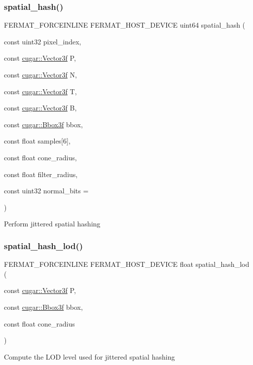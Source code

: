 \subsubsection{\texorpdfstring{spatial\+\_\+hash()}{spatial\_hash()}\hspace{0.1cm}{\footnotesize\ttfamily [2/2]}}
{\footnotesize\ttfamily F\+E\+R\+M\+A\+T\+\_\+\+F\+O\+R\+C\+E\+I\+N\+L\+I\+NE F\+E\+R\+M\+A\+T\+\_\+\+H\+O\+S\+T\+\_\+\+D\+E\+V\+I\+CE uint64 spatial\+\_\+hash (\begin{DoxyParamCaption}\item[{const uint32}]{pixel\+\_\+index,  }\item[{const \hyperlink{structcugar_1_1_vector}{cugar\+::\+Vector3f}}]{P,  }\item[{const \hyperlink{structcugar_1_1_vector}{cugar\+::\+Vector3f}}]{N,  }\item[{const \hyperlink{structcugar_1_1_vector}{cugar\+::\+Vector3f}}]{T,  }\item[{const \hyperlink{structcugar_1_1_vector}{cugar\+::\+Vector3f}}]{B,  }\item[{const \hyperlink{structcugar_1_1_bbox}{cugar\+::\+Bbox3f}}]{bbox,  }\item[{const float}]{samples\mbox{[}6\mbox{]},  }\item[{const float}]{cone\+\_\+radius,  }\item[{const float}]{filter\+\_\+radius,  }\item[{const uint32}]{normal\+\_\+bits = {} }\end{DoxyParamCaption})}

Perform jittered spatial hashing \mbox{\label{group___spatial_hash_module_gac8381b402e3663f4c235952ca96a5391}} 
\subsubsection{\texorpdfstring{spatial\+\_\+hash\+\_\+lod()}{spatial\_hash\_lod()}}
{\footnotesize\ttfamily F\+E\+R\+M\+A\+T\+\_\+\+F\+O\+R\+C\+E\+I\+N\+L\+I\+NE F\+E\+R\+M\+A\+T\+\_\+\+H\+O\+S\+T\+\_\+\+D\+E\+V\+I\+CE float spatial\+\_\+hash\+\_\+lod (\begin{DoxyParamCaption}\item[{const \hyperlink{structcugar_1_1_vector}{cugar\+::\+Vector3f}}]{P,  }\item[{const \hyperlink{structcugar_1_1_bbox}{cugar\+::\+Bbox3f}}]{bbox,  }\item[{const float}]{cone\+\_\+radius }\end{DoxyParamCaption})}

Compute the L\+OD level used for jittered spatial hashing 